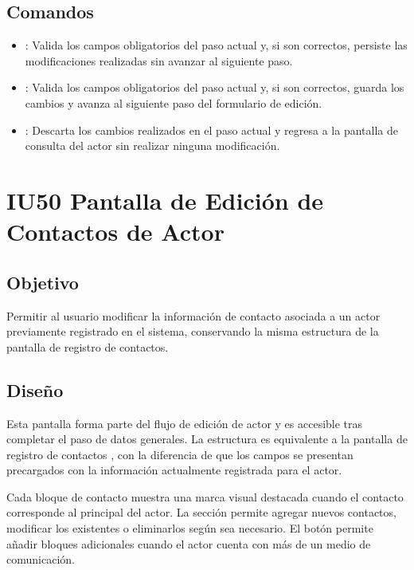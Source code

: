 \subsection{Comandos}
\begin{itemize}
	\item {}: Valida los campos obligatorios del paso 
	actual y, si son correctos, persiste las modificaciones realizadas sin 
	avanzar al siguiente paso.
	\item {}: Valida los campos obligatorios del paso actual 
	y, si son correctos, guarda los cambios y avanza al siguiente paso del 
	formulario de edición.
	\item {}: Descarta los cambios realizados en el paso actual 
	y regresa a la pantalla de consulta del actor  sin realizar ninguna modificación.
\end{itemize}

\section{IU50 Pantalla de Edición de Contactos de Actor}
\subsection{Objetivo}
Permitir al usuario modificar la información de contacto asociada a un actor 
previamente registrado en el sistema, conservando la misma estructura de la 
pantalla de registro de contactos.

\subsection{Diseño}
Esta pantalla  forma 
parte del flujo de edición de actor y es accesible tras completar el paso de 
datos generales. La estructura es equivalente a la pantalla de registro de 
contactos , con la 
diferencia de que los campos se presentan precargados con la información 
actualmente registrada para el actor.

Cada bloque de contacto muestra una marca visual destacada cuando el contacto 
corresponde al principal del actor. La sección permite agregar nuevos contactos, 
modificar los existentes o eliminarlos según sea necesario. El botón 
 permite añadir bloques adicionales cuando el actor 
cuenta con más de un medio de comunicación.

